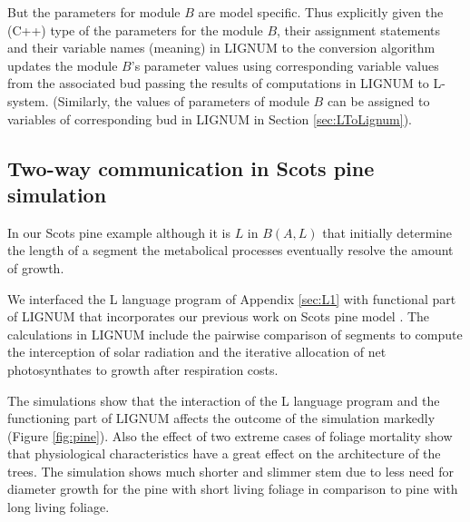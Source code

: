 But the parameters for module $B$ are model specific.  Thus explicitly
given  the (C++)  type of  the parameters  for the  module  $B$, their
assignment statements and their  variable names (meaning) in LIGNUM to
the  conversion algorithm  updates the  module $B$'s  parameter values
using corresponding  variable values  from the associated  bud passing
the results  of computations in  LIGNUM to L-system.   (Similarly, the
values of  parameters of  module $B$ can  be assigned to  variables of
corresponding bud in LIGNUM in Section \ref{sec:LToLignum}).

\subsection{Two-way communication in Scots pine simulation}

In  our  Scots  pine example  although  it  is  $L$ in  $B(A,L)$  that
initially determine the length  of a segment the metabolical processes
eventually resolve the amount of growth.
  
We  interfaced the L  language program  of Appendix  \ref{sec:L1} with
functional part of LIGNUM that incorporates our previous work on Scots
pine  model \citep{perttunen:96,  perttunen:98}.  The  calculations in
LIGNUM  include the  pairwise comparison  of segments  to  compute the
interception of  solar radiation and  the iterative allocation  of net
photosynthates to growth after respiration costs.

The simulations  show that the  interaction of the L  language program
and  the  functioning  part  of  LIGNUM affects  the  outcome  of  the
simulation markedly  (Figure \ref{fig:pine}).  Also the effect  of two
extreme   cases   of  foliage   mortality   show  that   physiological
characteristics have a great effect  on the architecture of the trees.
The simulation  shows much shorter and  slimmer stem due  to less need
for  diameter  growth  for  the  pine with  short  living  foliage  in
comparison to pine with long living foliage.

